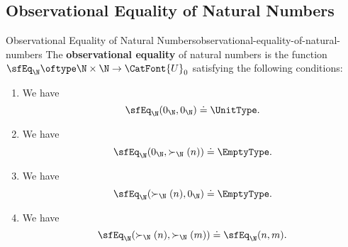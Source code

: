 \subsection{Observational Equality of Natural Numbers}\label{subsection-observational-equality-of-natural-numbers}
\begin{definition}{Observational Equality of Natural Numbers}{observational-equality-of-natural-numbers}%
    The \textbf{observational equality} of natural numbers is the function$\sfEq_{\N}\oftype\N\times\N\to\CatFont{U}_{0}$ satisfying the following conditions:
    \begin{enumerate}
        \item\label{observational-equality-of-natural-numbers-zero-is-observationally-equal-to-zero}We have%
            \[
                \sfEq_{\N}(0_{\N},0_{\N})%
                \doteq%
                \UnitType.%
            \]%
        \item\label{observational-equality-of-natural-numbers-zero-is-not-a-sucessor}We have%
            \[
                \sfEq_{\N}(0_{\N},\succ_{\N}(n))%
                \doteq%
                \EmptyType.%
            \]%
        \item\label{observational-equality-of-natural-numbers-successor-is-not-zero}We have%
            \[
                \sfEq_{\N}(\succ_{\N}(n),0_{\N})%
                \doteq%
                \EmptyType.%
            \]%
        \item\label{observational-equality-of-natural-numbers-when-successors-are-observationally-equal}We have%
            \[
                \sfEq_{\N}(\succ_{\N}(n),\succ_{\N}(m))%
                \doteq%
                \sfEq_{\N}(n,m).%
            \]%
    \end{enumerate}
\end{definition}
